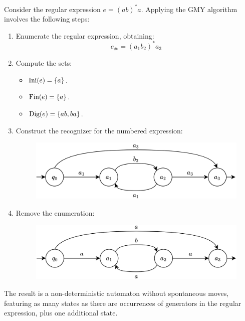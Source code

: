 \begin{example}
    Consider the regular expression $e=(ab)^{*}a$.
    Applying the GMY algorithm involves the following steps:
    \begin{enumerate}
        \item Enumerate the regular expression, obtaining: 
            \[e_{\#}=(a_1b_2)^{*}a_3\]
        \item Compute the sets:
            \begin{itemize}
                \item $\textnormal{Ini}(e)=\{a\}$.
                \item $\textnormal{Fin}(e)=\{a\}$.
                \item $\textnormal{Dig}(e)=\{ab,ba\}$.
            \end{itemize}
        \item Construct the recognizer for the numbered expression:
            \begin{figure}[H]
                \centering
                \includegraphics[width=0.75\linewidth]{images/gmy1.png}
            \end{figure}
        \item Remove the enumeration: 
            \begin{figure}[H]
                \centering
                \includegraphics[width=0.75\linewidth]{images/gmy2.png}
            \end{figure}
    \end{enumerate}
    The result is a non-deterministic automaton without spontaneous moves, featuring as many states as there are occurrences of generators in the regular expression, plus one additional state.
\end{example}

